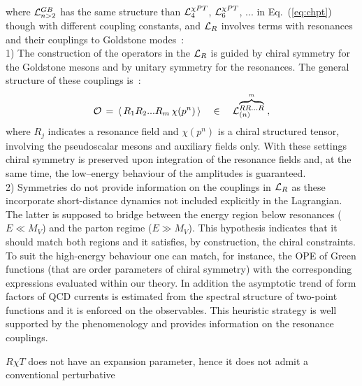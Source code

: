 \documentclass{appolb}
\begin{document}
where ${\cal L}_{n>2}^{GB}$ has the same structure than ${\cal L}_4^{\chi PT}$, ${\cal L}_6^{\chi PT}$, ...
in Eq.~(\ref{eq:chpt}) though with different coupling constants, and ${\cal L}_R$ involves terms with resonances and their couplings to Goldstone modes~:
\vspace*{0.2cm} \\
1) The construction of the operators in the ${\cal L}_R$ is guided by chiral symmetry for the Goldstone
mesons and by unitary symmetry for the resonances. The general structure of these couplings is~:
\begin{equation} \label{eq:structure}
{\cal O} \, = \, \langle \, R_1 R_2 ...R_m \, \chi(p^n)  \, \rangle \, \; \; \; \in \; \; \; \, 
{\cal L}_{(n)}^{\overbrace{\scriptstyle RR...R}^{m}} \; ,
\end{equation}
where  $R_j$ indicates a resonance field and $\chi (p^n)$ is a chiral structured tensor, involving the pseudoscalar mesons and auxiliary fields only. With these settings chiral symmetry is preserved
upon integration of the resonance fields and, at the same time, the low--energy behaviour 
of the amplitudes is guaranteed.  
\vspace*{0.1cm} \\
2) Symmetries do not provide information on the couplings in ${\cal L}_R$ as these incorporate short-distance
dynamics not included explicitly in the Lagrangian. The latter 
is supposed to bridge between the energy region below resonances ($E \ll M_V$) and the parton
regime ($E \gg M_V$). This hypothesis indicates that it should match both regions and it satisfies,
by construction, the chiral constraints. To suit the high-energy behaviour one can match, for instance,
the OPE of Green functions (that are order parameters of chiral symmetry) with the corresponding expressions evaluated within our theory. In addition the asymptotic trend of form factors of QCD currents is estimated  from the spectral structure of two-point functions and it is enforced on the observables. This heuristic strategy is well supported by the
phenomenology \cite{Peris:1998nj,Cirigliano:2006hb,Knecht:2001xc,Cirigliano:2004ue,Cirigliano:2005xn}
and provides information on the resonance couplings.
\par
$R \chi T$ does not have an expansion parameter, hence it does not admit a conventional perturbative
\end{document}
